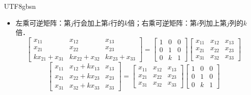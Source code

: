 \documentclass[12pt]{article}
\begin{document}
\begin{CJK}{UTF8}{gbsn}
\begin{itemize}
\begin{equation}
\begin{array}{ccc}
\end{array}
\right]
\end{equation}
\item[\textbf{行/列缩放相加}] 左乘可逆矩阵：第$j$行会加上第$i$行的$k$倍；右乘可逆矩阵：第$i$列加上第$j$列的$k$倍．
\begin{equation}
\left[
\begin{array}{ccc}
x_{11} & x_{12} & x_{13}\\
x_{21} & x_{22} & x_{23}\\
kx_{21}+x_{31} & kx_{22}+x_{32} & kx_{23}+x_{33}
\end{array}
\right]
=
\left[
\begin{array}{ccc}
1 & 0 & 0\\
0 & 1 & 0\\
0 & k & 1
\end{array}
\right]
\left[
\begin{array}{ccc}
x_{11} & x_{12} & x_{13}\\
x_{21} & x_{22} & x_{23}\\
x_{31} & x_{32} & x_{33}
\end{array}
\right]
\end{equation}
\begin{equation}
\left[
\begin{array}{ccc}
x_{11} & x_{12}+kx_{13} & x_{13}\\
x_{21} & x_{22}+kx_{23} & x_{23}\\
x_{31} & x_{32}+kx_{33} & x_{33}
\end{array}
\right]
=
\left[
\begin{array}{ccc}
x_{11} & x_{12} & x_{13}\\
x_{21} & x_{22} & x_{23}\\
x_{31} & x_{32} & x_{33}
\end{array}
\right]
\left[
\begin{array}{ccc}
1 & 0 & 0\\
0 & 1 & 0\\
0 & k & 1
\end{array}
\right]
\end{equation}
\end{itemize}

\end{CJK}
\end{document}
